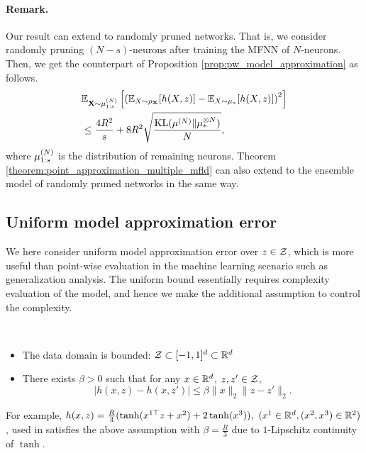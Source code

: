 \paragraph{Remark.} Our result can extend to randomly pruned networks. That is, we consider randomly pruning $(N-s)$-neurons after training the MFNN of $N$-neurons.
Then, we get the counterpart of Proposition \ref{prop:pw_model_approximation} as follows.
\begin{align*} 
    &\bE_{\vX \sim \pow[\mu,N]_{1:s}}\left[ \left( \bE_{X \sim \rho_\vX}[ h(X,z)] - \bE_{X\sim\mu_*}[h(X,z)]\right)^2 \right]  \\
    &\leq \frac{4R^2}{s} + 8R^2\sqrt{ \frac{\KL(\pow[\mu,N]\|\tensor[\mu_*,N])}{N}},
\end{align*}
where $\pow[\mu,N]_{1:s}$ is the distribution of remaining neurons. Theorem \ref{theorem:point_approximation_multiple_mfld} can also extend to the ensemble model of randomly pruned networks in the same way.

\subsection{Uniform model approximation error}\label{subsec:uniform_model_error}
We here consider uniform model approximation error over $z \in \mathcal{Z}$, which is more useful than point-wise evaluation in the machine learning scenario such as generalization analysis. The uniform bound essentially requires complexity evaluation of the model, and hence we make the additional assumption to control the complexity. 

\begin{assumption}\label{assumption:model_constraint}~
    \begin{itemize}[itemsep=0mm,leftmargin=5mm,topsep=0mm]
        \item The data domain is bounded: $\mathcal{Z} \subset [-1,1]^{d} \subset \mathbb{R}^{d}$
        \item There exists $\beta>0$ such that for any $x\in \mathbb{R}^d$, $z, z' \in \mathcal{Z}$, 
        \[ | h(x,z) - h(x,z')| \leq \beta \|x\|_2  \| z - z' \|_2. \]
    \end{itemize}
\end{assumption}
For example, $h(x,z)= \frac{R}{3}(\tanh(x^{1\top}z + x^2) + 2 \tanh(x^3)),~(x^1 \in \mathbb{R}^{d}, (x^2, x^3) \in \mathbb{R}^2)$, used in \citet{suzuki2023featurelearning} satisfies the above assumption with $\beta=\frac{R}{3}$ due to $1$-Lipschitz continuity of $\tanh$.

